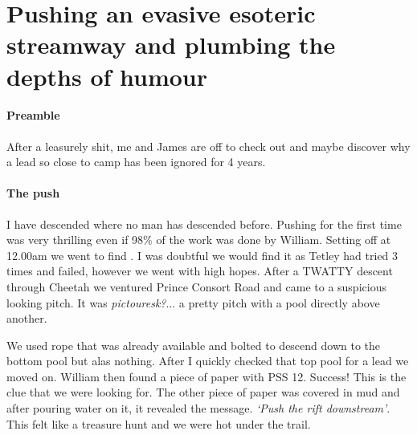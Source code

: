 

\section{Pushing an evasive esoteric streamway and plumbing the depths of humour}

\begin{marginfigure}
\end{marginfigure}

\paragraph{Preamble}
After a leasurely shit, me and James are off to check out  and maybe discover why a lead so close to camp has been ignored for 4 years.
\paragraph{The push} I have descended where no man has descended before. Pushing for the first time was very thrilling even if 98$\%$ of the work was done by William. 
Setting off at 12.00am we went to find . I was doubtful we would find it as Tetley had tried 3 times and failed, however we went with high hopes.
After a TWATTY descent through Cheetah we ventured Prince Consort Road and came to a suspicious looking pitch. It was \textit{pictouresk?}...  a pretty pitch with a pool directly above another.

We used rope that was already available and bolted to descend down to the bottom pool but alas nothing. After I quickly checked that top pool for a lead we moved on. William then found a piece of paper with PSS 12. Success! This is the clue that we were looking for. The other piece of paper was covered in mud and after pouring water on it, it revealed the message.  \textit{`Push the rift downstream'}. This felt like a treasure hunt and we were hot under the trail.


